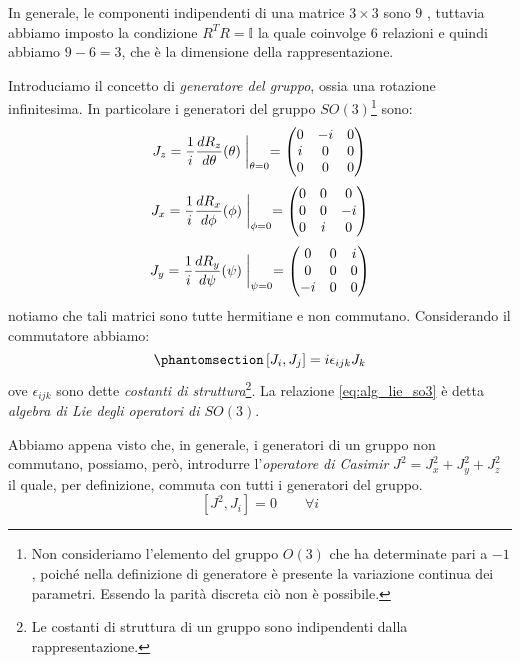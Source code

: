 In generale, le componenti indipendenti di una matrice $3\times3$ sono $9$ , tuttavia abbiamo imposto la condizione $R^TR=\mathds{I}$ la quale coinvolge $6$ relazioni e quindi abbiamo $9-6=3$, che è la dimensione della rappresentazione.

Introduciamo il concetto di \textit{generatore del gruppo}, ossia una rotazione infinitesima. In particolare i generatori del gruppo $SO(3)$\footnote{Non consideriamo l'elemento del gruppo $O(3)$ che ha determinate pari a $-1$, poiché nella definizione di generatore è presente la variazione continua dei parametri. Essendo la parità discreta ciò non è possibile.} sono:
\begin{equation}
    J_z=\dfrac{1}{i}\dfrac{dR_z}{d\theta}(\theta)\biggm|_{\theta=0}= 
    \begin{pmatrix}
         0&-i&0  \\
  i&0&0\\
0&0&0\\
    \end{pmatrix}
\end{equation}
\begin{equation}
    J_x=\dfrac{1}{i}\dfrac{dR_x}{d\phi}(\phi)\biggm|_{\phi=0}= 
    \begin{pmatrix}
         0&0&0  \\
  0&0&-i\\
0&i&0\\
    \end{pmatrix}
\end{equation}
\begin{equation}
    J_y=\dfrac{1}{i}\dfrac{dR_y}{d\psi}(\psi)\biggm|_{\psi=0}= 
    \begin{pmatrix}
         0&0&i  \\
  0&0&0\\
-i&0&0\\
    \end{pmatrix}
\end{equation}
notiamo che tali matrici sono tutte hermitiane e non commutano. Considerando il commutatore abbiamo:
\begin{equation}\phantomsection\label{eq:alg_lie_so3}
    \left[J_i,J_j\right]=i\epsilon_{ijk}J_k
\end{equation}
ove $\epsilon_{ijk}$ sono dette \textit{costanti di struttura}\footnote{Le costanti di struttura di un gruppo sono indipendenti dalla rappresentazione.}. La relazione \eqref{eq:alg_lie_so3} è detta \textit{algebra di Lie degli operatori di $SO(3)$}.

Abbiamo appena visto che, in generale, i generatori di un gruppo non commutano, possiamo, però, introdurre l'\textit{operatore di Casimir} $J^2=J_x^2+J_y^2+J_z^2$ il quale, per definizione, commuta con tutti i generatori del gruppo.
\begin{equation}
    \left[J^2,J_i\right]=0 \qquad \forall i
\end{equation}

